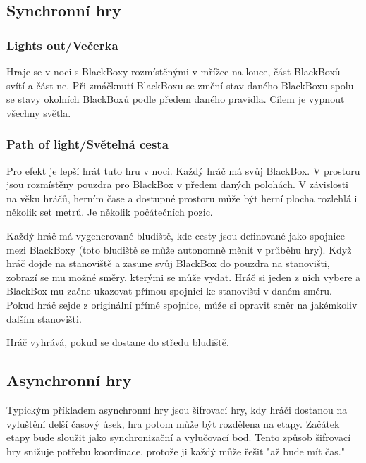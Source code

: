 \subsection{Synchronní hry}

\subsubsection{Lights out/Večerka}

Hraje se v noci s BlackBoxy rozmístěnými v mřížce na louce, část BlackBoxů svítí a část ne.
Při zmáčknutí BlackBoxu se změní stav daného BlackBoxu spolu se stavy okolních BlackBoxů podle předem daného pravidla.
Cílem je vypnout všechny světla.

\subsubsection{Path of light/Světelná cesta}

Pro efekt je lepší hrát tuto hru v noci.
Každý hráč má svůj BlackBox.
V prostoru jsou rozmístěny pouzdra pro BlackBox v předem daných polohách.
V závislosti na věku hráčů, herním čase a dostupné prostoru může být herní plocha rozlehlá i několik set metrů.
Je několik počátečních pozic.

Každý hráč má vygenerované bludiště, kde cesty jsou definované jako spojnice mezi BlackBoxy (toto bludiště se může autonomně měnit v průběhu hry).
Když hráč dojde na stanoviště a zasune svůj BlackBox do pouzdra na stanovišti, zobrazí se mu možné směry, kterými se může vydat.
Hráč si jeden z nich vybere a BlackBox mu začne ukazovat přímou spojnici ke stanovišti v daném směru.
Pokud hráč sejde z originální přímé spojnice, může si opravit směr na jakémkoliv dalším stanovišti.

Hráč vyhrává, pokud se dostane do středu bludiště.


\subsection{Asynchronní hry}

Typickým příkladem asynchronní hry jsou šifrovací hry, kdy hráči dostanou na vyluštění delší časový úsek, hra potom může být rozdělena na etapy.
Začátek etapy bude sloužit jako synchronizační a vylučovací bod.
Tento způsob šifrovací hry snižuje potřebu koordinace, protože ji každý může řešit "až bude mít čas."
